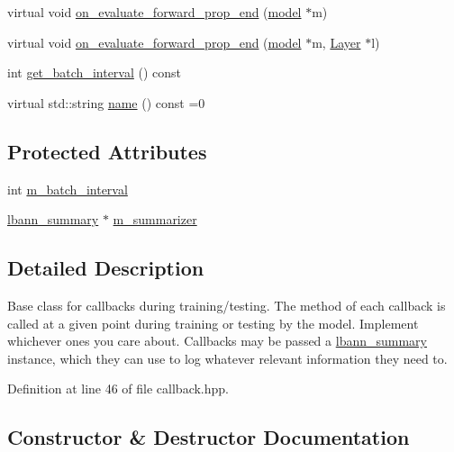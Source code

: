 \begin{DoxyCompactItemize}
\item 
virtual void \hyperlink{classlbann_1_1lbann__callback_a0794f3fb88db6fef53f0e2f235f94424}{on\+\_\+evaluate\+\_\+forward\+\_\+prop\+\_\+end} (\hyperlink{classlbann_1_1model}{model} $\ast$m)
\item 
virtual void \hyperlink{classlbann_1_1lbann__callback_ae23c5a61b81dbdfbd79736ac2b6035aa}{on\+\_\+evaluate\+\_\+forward\+\_\+prop\+\_\+end} (\hyperlink{classlbann_1_1model}{model} $\ast$m, \hyperlink{classlbann_1_1Layer}{Layer} $\ast$l)
\item 
int \hyperlink{classlbann_1_1lbann__callback_acec888932129f93ba2a0077192467c9e}{get\+\_\+batch\+\_\+interval} () const
\item 
virtual std\+::string \hyperlink{classlbann_1_1lbann__callback_a7522c7a14f1d6a1ea762cc2d7248eb3a}{name} () const =0
\end{DoxyCompactItemize}
\subsection*{Protected Attributes}
\begin{DoxyCompactItemize}
\item 
int \hyperlink{classlbann_1_1lbann__callback_a6126e310e9924398c18ccf76bb91c705}{m\+\_\+batch\+\_\+interval}
\item 
\hyperlink{classlbann_1_1lbann__summary}{lbann\+\_\+summary} $\ast$ \hyperlink{classlbann_1_1lbann__callback_a277d46138184f85f161a8263b8322c76}{m\+\_\+summarizer}
\end{DoxyCompactItemize}


\subsection{Detailed Description}
Base class for callbacks during training/testing. The method of each callback is called at a given point during training or testing by the model. Implement whichever ones you care about. Callbacks may be passed a \hyperlink{classlbann_1_1lbann__summary}{lbann\+\_\+summary} instance, which they can use to log whatever relevant information they need to. 

Definition at line 46 of file callback.\+hpp.



\subsection{Constructor \& Destructor Documentation}
\mbox{\label{classlbann_1_1lbann__callback_a679057298a41ddd47f08c157f756c584}} 
